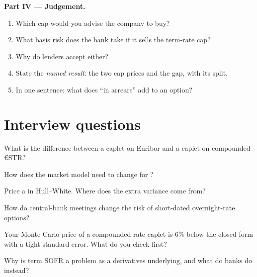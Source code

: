 \begin{problem}
\medskip\noindent\textbf{Part IV --- Judgement.}
\begin{enumerate}[resume]
\item Which cap would you advise the company to buy?
\item What basis risk does the bank take if it sells the term-rate cap?
\item Why do lenders accept either?
\item State the \emph{named result}: the two cap prices and the gap, with its split.
\item In one sentence: what does ``in arrears'' add to an option?
\end{enumerate}
\end{problem}

\section{Interview questions}

\begin{interviewq}\label{iq:rc:modelling-overnight-rate-products:1}
What is the difference between a caplet on Euribor and a caplet on compounded
€STR?
\end{interviewq}

\begin{interviewq}\label{iq:rc:modelling-overnight-rate-products:2}
How does the market model need to change for ?
\end{interviewq}

\begin{interviewq}\label{iq:rc:modelling-overnight-rate-products:3}
Price a  in Hull--White. Where does the extra variance come
from?
\end{interviewq}

\begin{interviewq}\label{iq:rc:modelling-overnight-rate-products:4}
How do central-bank meetings change the risk of short-dated overnight-rate options?
\end{interviewq}

\begin{interviewq}\label{iq:rc:modelling-overnight-rate-products:5}
Your Monte Carlo price of a compounded-rate caplet is 6\% below the closed form with
a tight standard error. What do you check first?
\end{interviewq}

\begin{interviewq}\label{iq:rc:modelling-overnight-rate-products:6}
Why is term SOFR a problem as a derivatives underlying, and what do banks do instead?
\end{interviewq}
